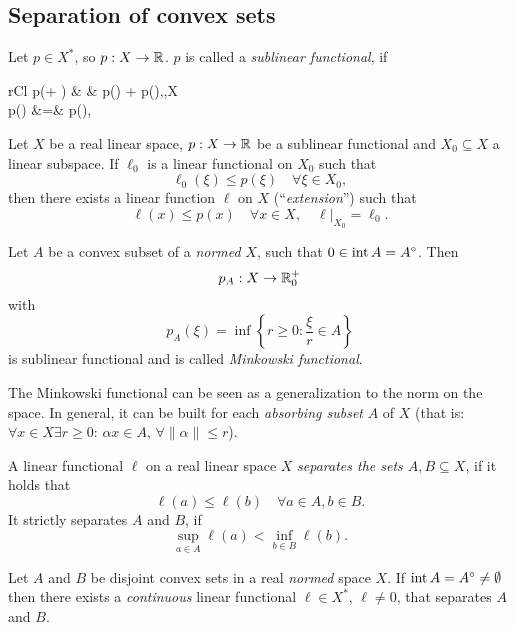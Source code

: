 \documentclass[../skript.tex]{subfiles}
\begin{document}
\subsection*{Separation of convex sets}
\begin{remark*}
	Let $p\in X^*$, so $p:X\to\mathbb{R}$. $p$ is called a \emph{sublinear functional}, if
	\begin{IEEEeqnarray*}{rCl}
		p(\xi + \eta) & \leq & p(\xi) + p(\eta),\quad  \forall \xi,\eta\in X\\
		p(\alpha\xi) &=& \alpha p(\xi), \quad {}\alpha {} 
	\end{IEEEeqnarray*}
\end{remark*}
\begin{theoremnonumb} %
Let $X$ be a real linear space, $p : X \to \mathbb{R}$ be a sublinear functional and $X_0\subseteq X$ a linear subspace. If $\ell_0$ is a linear functional on $X_0$ such that 
\[
	\ell_0(\xi) \leq p(\xi) \quad \forall \xi \in X_0,
\]
then there exists a linear function $\ell$ on $X$ (``\emph{extension}'') such that
\[
	\ell(x) \leq p(x) \quad \forall x \in X, \quad \ell|_{X_0} = \ell_0.
\]
\end{theoremnonumb}
\begin{definitionnonumb} %
Let $A$ be a convex subset of a \emph{normed} $X$, such that $0 \in \operatorname{int} A = A^\circ$. Then
\[
	p_A:X\to \mathbb{R}_0^+
\]
with 
\[
	p_A(\xi) = \inf \left\{ r \geq 0 : \frac{\xi}{r} \in A \right\}
\]
is sublinear functional and is called \emph{Minkowski functional}.
\end{definitionnonumb}
\begin{remark*}
	The Minkowski functional can be seen as a generalization to the norm on the space. In general, it can be built for each \emph{absorbing subset} $A$ of $X$ (that is: $\forall x\in X\exists r\geq 0:\,\alpha x\in A,\,\forall\|\alpha\|\leq r$).
\end{remark*}
\begin{definition} %
\label{def:c1e6}
A linear functional $\ell$ on a real linear space $X$ \emph{separates the sets $A, B \subseteq X$}, if it holds that
\[
	\ell(a) \leq \ell(b) \quad \forall a \in A, b \in B.
\]
It strictly separates $A$ and $B$, if
\[
	\sup_{a \in A} \ell(a) < \inf_{b \in B} \ell(b).
\]
\end{definition}
\begin{theorem} %
\label{thm:c1e7}
Let $A$ and $B$ be disjoint convex sets in a real \emph{normed} space $X$. If $\operatorname{int} A = A^\circ \neq \emptyset$ then there exists a \emph{continuous} linear functional $\ell \in X^*$, $\ell \neq 0$, that separates $A$ and $B$.
\end{theorem}
\end{document}
